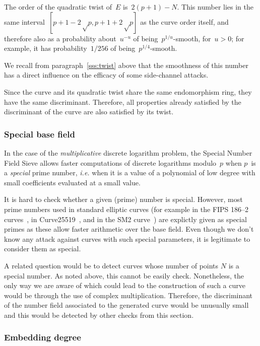 \documentclass[twocolumn,letterpaper,10pt]{article}
\begin{document}
The order of the quadratic twist of~$E$ is~$2(p+1) - N$.
This number lies in the same interval~$[p+1-2√p, p+1+2√p]$
as the curve order itself,
and therefore also as a probability about~$u^{-u}$
of being~$p^{1/u}$-smooth, for~$u > 0$;
for example, it has probability~$1/256$ of being~$p^{1/4}$-smooth.

We recall from paragraph~\ref{sss:twist} above
that the smoothness of this number has a direct influence
on the efficacy of some side-channel attacks.

Since the curve and its quadratic twist
share the same endomorphism ring,
they have the same discriminant.
Therefore, all properties already satisfied
by the discriminant of the curve are also satisfied by its twist.

\subsubsection{Special base field}
\label{sss:special-anormal}

In the case of the \emph{multiplicative} discrete logarithm problem,
the Special Number Field Sieve allows faster computations
of discrete logarithms modulo~$p$
when $p$~is a \emph{special} prime number,
\emph{i.e.} when it is a value of a polynomial of low degree
with small coefficients evaluated at a small value.

It is hard to check whether a given (prime) number is special.
However, most prime numbers used in standard elliptic curves
(for example in the FIPS 186--2 curves~\cite{nist2000fips186-2},
in Curve25519~\cite{pkc2006bernstein},
and in the SM2 curve~\cite{oscca2010sm2})
are explictly given as special primes as these allow faster arithmetic
over the base field.
Even though we don't know any attack against curves with such special
parameters, it is legitimate to consider them as special.

A related question would be to detect curves whose number of points $N$
is a special number.
As noted above, this cannot be easily check.
Nonetheless, the only way we are aware of which could lead to the construction
of such a curve would be through the use of complex multiplication.
Therefore, the discriminant of the number field associated
to the generated curve would be unusually small and this would be detected by
other checks from this section.

\subsubsection{Embedding degree}
\end{document}
